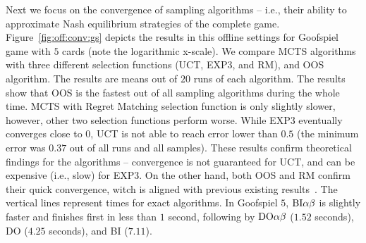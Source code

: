 Next we focus on the convergence of sampling algorithms -- i.e., their ability to approximate Nash equilibrium strategies of the complete game. 
Figure~\ref{fig:off:conv:gs} depicts the results in this offline settings for Goofspiel game with $5$ cards (note the logarithmic x-scale).
We compare MCTS algorithms with three different selection functions (UCT, EXP3, and RM), and OOS algorithm. 
The results are means out of $20$ runs of each algorithm.
The results show that OOS is the fastest out of all sampling algorithms during the whole time. 
MCTS with Regret Matching selection function is only slightly slower, however, other two selection functions perform worse. 
While EXP3 eventually converges close to $0$, UCT is not able to reach error lower than $0.5$ (the minimum error was $0.37$ out of all runs and all samples).
These results confirm theoretical findings for the algorithms -- convergence is not guaranteed for UCT, and can be expensive (i.e., slow) for EXP3. 
On the other hand, both OOS and RM confirm their quick convergence, witch is aligned with previous existing results~\cite{}.
The vertical lines represent times for exact algorithms.
In Goofspiel $5$, $\textrm{BI}\alpha\beta$ is slightly faster and finishes first in less than $1$ second, following by $\textrm{DO}\alpha\beta$ ($1.52$ seconds), \textsc{DO} ($4.25$ seconds), and \textsc{BI} ($7.11$).


